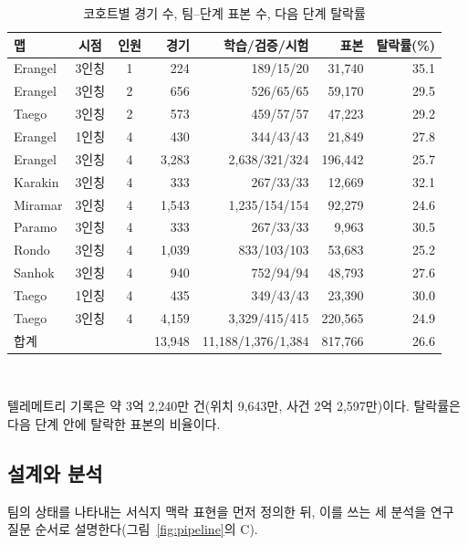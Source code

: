 \begin{table}[t]
\centering
\caption{코호트별 경기 수, 팀--단계 표본 수, 다음 단계 탈락률}
\label{tab:cohorts}
\footnotesize
\setlength{\tabcolsep}{3pt}
\begin{tabular}{lccrrrr}
\hline
맵 & 시점 & 인원 & 경기 & 학습/검증/시험 & 표본 & 탈락률(\%) \\
\hline
Erangel & 3인칭 & 1 & 224 & 189/15/20 & 31,740 & 35.1 \\
Erangel & 3인칭 & 2 & 656 & 526/65/65 & 59,170 & 29.5 \\
Taego & 3인칭 & 2 & 573 & 459/57/57 & 47,223 & 29.2 \\
Erangel & 1인칭 & 4 & 430 & 344/43/43 & 21,849 & 27.8 \\
Erangel & 3인칭 & 4 & 3,283 & 2,638/321/324 & 196,442 & 25.7 \\
Karakin & 3인칭 & 4 & 333 & 267/33/33 & 12,669 & 32.1 \\
Miramar & 3인칭 & 4 & 1,543 & 1,235/154/154 & 92,279 & 24.6 \\
Paramo & 3인칭 & 4 & 333 & 267/33/33 & 9,963 & 30.5 \\
Rondo & 3인칭 & 4 & 1,039 & 833/103/103 & 53,683 & 25.2 \\
Sanhok & 3인칭 & 4 & 940 & 752/94/94 & 48,793 & 27.6 \\
Taego & 1인칭 & 4 & 435 & 349/43/43 & 23,390 & 30.0 \\
Taego & 3인칭 & 4 & 4,159 & 3,329/415/415 & 220,565 & 24.9 \\
\hline
합계 & & & 13,948 & 11,188/1,376/1,384 & 817,766 & 26.6 \\
\hline
\end{tabular}
\\[2pt]
\parbox{\columnwidth}{\scriptsize {} 텔레메트리 기록은 약 3억 2,240만 건(위치 9,643만, 사건 2억 2,597만)이다. 탈락률은 다음 단계 안에 탈락한 표본의 비율이다.}
\end{table}

\subsection{설계와 분석}
\label{sec:method:design}
팀의 상태를 나타내는 서식지 맥락 표현을 먼저 정의한 뒤, 이를 쓰는 세 분석을 연구 질문 순서로 설명한다(그림~\ref{fig:pipeline}의 C).

